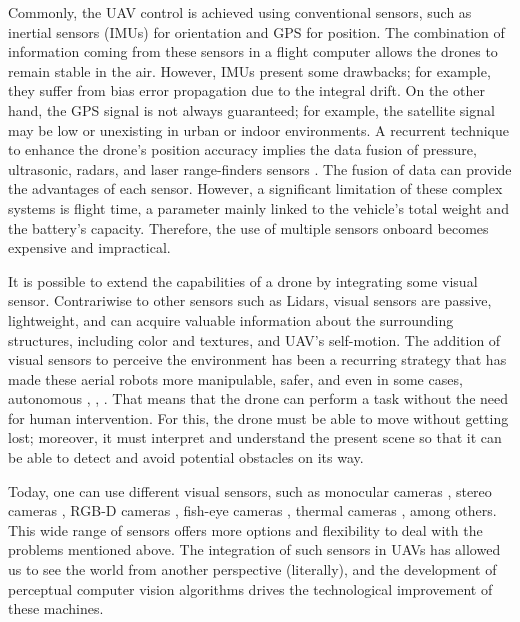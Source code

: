 Commonly, the UAV control is achieved using conventional sensors, such as inertial sensors (IMUs) for orientation and GPS for position. The combination of information coming from these sensors in a flight computer allows the drones to remain stable in the air. However, IMUs present some drawbacks; for example, they suffer from bias error propagation due to the integral drift. On the other hand, the GPS signal is not always guaranteed; for example, the satellite signal may be low or unexisting in urban or indoor environments. A recurrent technique to enhance the drone's position accuracy implies the data fusion of pressure, ultrasonic, radars, and laser range-finders sensors \citep{Tomic.Schmid.ea:IRAM:2012}. The fusion of data can provide the advantages of each sensor. However, a significant limitation of these complex systems is flight time, a parameter mainly linked to the vehicle's total weight and the battery's capacity. Therefore, the use of multiple sensors onboard becomes expensive and impractical.

It is possible to extend the capabilities of a drone by integrating some visual sensor. Contrariwise to other sensors such as Lidars, visual sensors are passive, lightweight, and can acquire valuable information about the surrounding structures, including color and textures, and UAV's self-motion. The addition of visual sensors to perceive the environment has been a recurring strategy that has made these aerial robots more manipulable, safer, and even in some cases, autonomous \citep{He.Qiao.ea:CM:2018}, \citep{Kyrkou.Timotheou.ea:POT:2019}, \citep{Zhu.Wen.ea:arXiv:2020}. That means that the drone can perform a task without the need for human intervention. For this, the drone must be able to move without getting lost; moreover, it must interpret and understand the present scene so that it can be able to detect and avoid potential obstacles on its way. 

Today, one can use different visual sensors, such as monocular cameras \citep{Padhy.Xia.ea:TSC:2018}, stereo cameras \citep{Seitz.Curless.ea:CVPR:2006}, RGB-D cameras \citep{Huang.Bachrach.ea:RobR:2017}, fish-eye cameras \citep{Hrabar.Sukhatme:IROS:2004}, thermal cameras \citep{Gaszczak.Breckon.ea:IRCV:2011}, among others. This wide range of sensors offers more options and flexibility to deal with the problems mentioned above. The integration of such sensors in UAVs has allowed us to see the world from another perspective (literally), and the development of perceptual computer vision algorithms drives the technological improvement of these machines.

